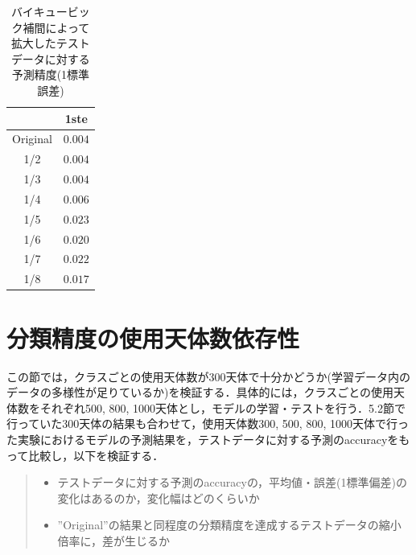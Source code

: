 \documentclass[a4j, 11pt]{jreport}
\begin{document}
\begin{table}[H]
  \centering
	\caption{バイキュービック補間によって拡大したテストデータに対する予測精度(1標準誤差)}
  \begin{tabular}{|c|c|}
		\hline
    & 1ste \\ \hline
    Original & $0.004$ \\ \hline
    1/2 & $0.004$ \\ \hline
    1/3 & $0.004$ \\ \hline
    1/4 & $0.006$ \\ \hline
    1/5 & $0.023$ \\ \hline
    1/6 & $0.020$ \\ \hline
    1/7 & $0.022$ \\ \hline
    1/8 & $0.017$ \\ \hline
  \end{tabular}
  \label{tb:accs_4_2_cubic_1ste}
\end{table}



\newpage
\section{分類精度の使用天体数依存性}
この節では，クラスごとの使用天体数が300天体で十分かどうか(学習データ内のデータの多様性が足りているか)を検証する．具体的には，クラスごとの使用天体数をそれぞれ500, 800, 1000天体とし，モデルの学習・テストを行う．5.2節で行っていた300天体の結果も合わせて，使用天体数300, 500, 800, 1000天体で行った実験におけるモデルの予測結果を，テストデータに対する予測のaccuracyをもって比較し，以下を検証する．
\begin{quote}
 \begin{itemize}
  \item テストデータに対する予測のaccuracyの，平均値・誤差(1標準偏差)の変化はあるのか，変化幅はどのくらいか
  \item ''Original''の結果と同程度の分類精度を達成するテストデータの縮小倍率に，差が生じるか
 \end{itemize}
\end{quote}
\end{document}
